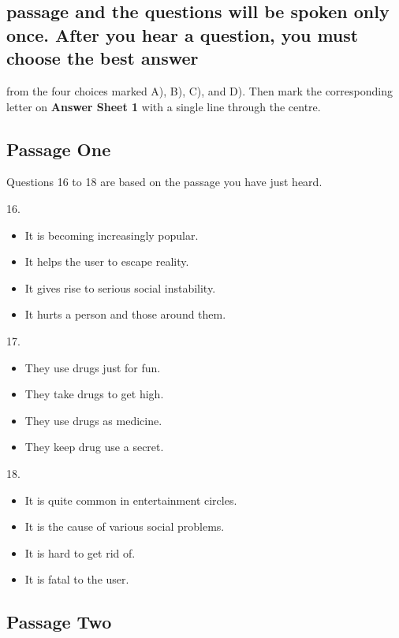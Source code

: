 \documentclass[UTF8,11pt]{ctexart}
\begin{document}
\subsection*{passage and the questions will be spoken only once. After you hear a question, you must choose the best answer}


from the four choices marked A), B), C), and D). Then mark the corresponding letter on\textbf{ Answer Sheet 1} with a single line through the centre.


\subsection*{Passage One}


Questions 16 to 18 are based on the passage you have just heard.


16.


\begin{itemize}[leftmargin=2em,itemsep=.2em,topsep=.4em]\item[A.] It is becoming increasingly popular.
\item[B.] It helps the user to escape reality.
\item[C.] It gives rise to serious social instability.
\item[D.] It hurts a person and those around them.
\end{itemize}

17.


\begin{itemize}[leftmargin=2em,itemsep=.2em,topsep=.4em]\item[A.] They use drugs just for fun.
\item[B.] They take drugs to get high.
\item[C.] They use drugs as medicine.
\item[D.] They keep drug use a secret.
\end{itemize}

18.


\begin{itemize}[leftmargin=2em,itemsep=.2em,topsep=.4em]\item[A.] It is quite common in entertainment circles.
\item[B.] It is the cause of various social problems.
\item[C.] It is hard to get rid of.
\item[D.] It is fatal to the user.
\end{itemize}

\subsection*{Passage Two}
\end{document}
